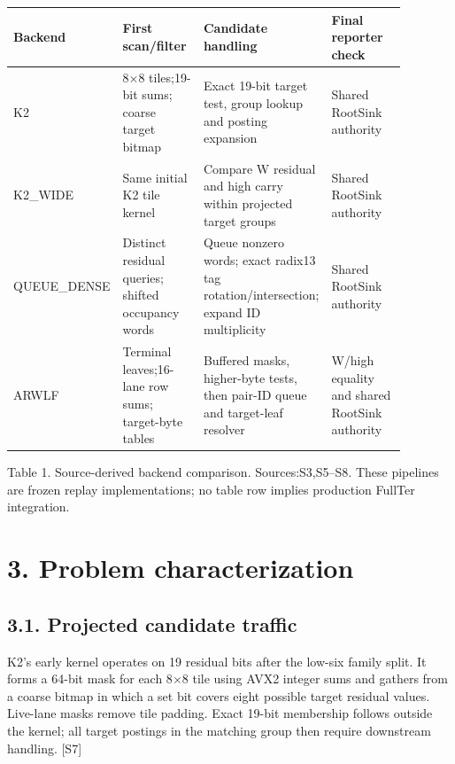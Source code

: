\documentclass[10pt,letterpaper]{article}
\begin{document}
{\small\setlength{\tabcolsep}{3pt}\begin{longtable}{p{0.221\linewidth} p{0.221\linewidth} p{0.221\linewidth} p{0.221\linewidth}}
\toprule

\textbf{Backend} & \textbf{First scan/filter} & \textbf{Candidate handling} & \textbf{Final reporter check} \\
\midrule\endhead

K2 & 8\ensuremath{\times}8 tiles;19-bit sums; coarse target bitmap & Exact 19-bit target test, group lookup and posting expansion & Shared RootSink authority \\

K2\_WIDE & Same initial K2 tile kernel & Compare W residual and high carry within projected target groups & Shared RootSink authority \\

QUEUE\_DENSE & Distinct residual queries; shifted occupancy words & Queue nonzero words; exact radix13 tag rotation/intersection; expand ID multiplicity & Shared RootSink authority \\

ARWLF & Terminal leaves;16-lane row sums; target-byte tables & Buffered masks, higher-byte tests, then pair-ID queue and target-leaf resolver & W/high equality and shared RootSink authority \\

\bottomrule\end{longtable}}

{\small\color{teal}Table 1. Source-derived backend comparison. Sources:S3,S5--S8. These pipelines are frozen replay implementations; no table row implies production FullTer integration.\par}

\section*{3. Problem characterization}

\subsection*{3.1. Projected candidate traffic}

K2's early kernel operates on 19 residual bits after the low-six family split. It forms a 64-bit mask for each 8\ensuremath{\times}8 tile using AVX2 integer sums and gathers from a coarse bitmap in which a set bit covers eight possible target residual values. Live-lane masks remove tile padding. Exact 19-bit membership follows outside the kernel; all target postings in the matching group then require downstream handling. [S7]
\end{document}

